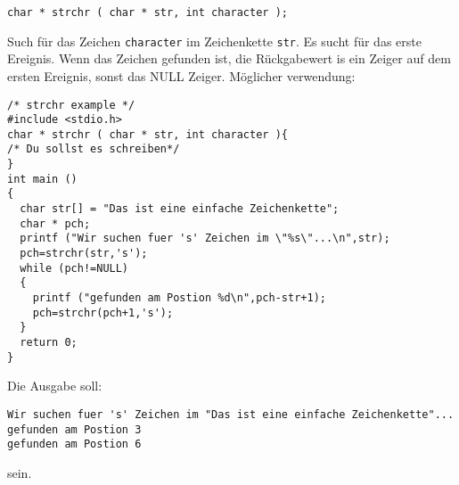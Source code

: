 \documentclass{article}[12pt]
\begin{document}
\begin{itemize}
\begin{lstlisting}
char * strchr ( char * str, int character );
\end{lstlisting}
Such für das Zeichen \texttt{character} im Zeichenkette \texttt{str}. Es sucht für das erste Ereignis.
Wenn das Zeichen gefunden ist, die Rückgabewert is ein Zeiger auf dem ersten Ereignis, sonst das NULL 
Zeiger. Möglicher verwendung:
\begin{lstlisting}
/* strchr example */
#include <stdio.h>
char * strchr ( char * str, int character ){
/* Du sollst es schreiben*/
}
int main ()
{
  char str[] = "Das ist eine einfache Zeichenkette";
  char * pch;
  printf ("Wir suchen fuer 's' Zeichen im \"%s\"...\n",str);
  pch=strchr(str,'s');
  while (pch!=NULL)
  {
    printf ("gefunden am Postion %d\n",pch-str+1);
    pch=strchr(pch+1,'s');
  }
  return 0;
}
\end{lstlisting}
Die Ausgabe soll:
\begin{lstlisting}
Wir suchen fuer 's' Zeichen im "Das ist eine einfache Zeichenkette"...
gefunden am Postion 3
gefunden am Postion 6
\end{lstlisting}
sein.

\end{itemize}
\end{document}
